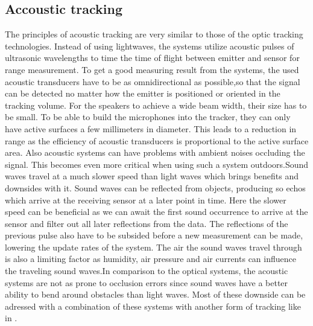 \subsection{Accoustic tracking}
The principles of acoustic tracking are very similar to those of the optic tracking technologies. Instead of using lightwaves, the systems utilize acoustic pulses of ultrasonic wavelengths to time the time of flight between emitter and sensor for range measurement. To get a good measuring result from the systems, the used acoustic transducers have to be as omnidirectional as possible,so that the signal can be detected no matter how the emitter is positioned or oriented in the tracking volume. For the speakers to achieve a wide beam width, their size has to be small.
To be able to build the microphones into the tracker, they can only have active surfaces a few millimeters in diameter. This leads to a reduction in range as the efficiency of acoustic transducers is proportional to the active surface area. Also acoustic systems can have problems with ambient noises occluding the signal. This becomes even more critical when using such a system outdoors.Sound waves travel at a much slower speed than light waves which brings benefits and downsides with it. Sound waves can be reflected from objects, producing so echos which arrive at the receiving sensor at a later point in time. Here the slower speed can be beneficial as we can await the first sound occurrence to arrive at the sensor and filter out all later reflections from the data. The reflections of the previous pulse also have to be subsided before a new measurement can be made, lowering the update rates of the system. The air the sound waves travel through is also a limiting factor as humidity, air pressure and air currents can influence the traveling sound waves.In comparison to the optical systems, the acoustic systems are not as prone to occlusion errors since sound waves have a better ability to bend around obstacles than light waves.
Most of these downside can be adressed with a combination of these systems with another form of tracking like in \cite{Foxlin.1998}.
